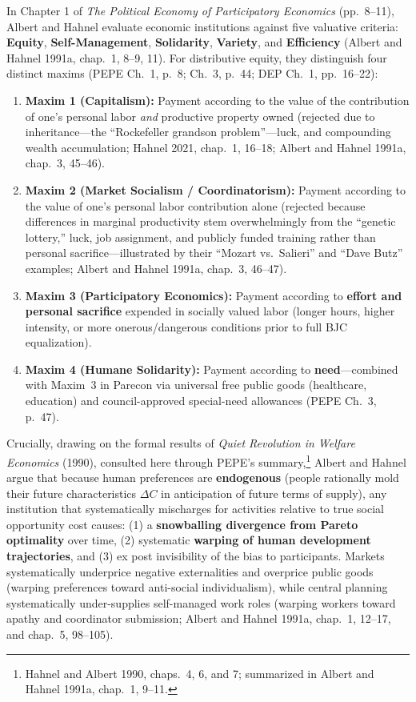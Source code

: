\documentclass[10pt,twoside,openany]{book}
\theoremstyle{dpepstyle}
\begin{document}
In Chapter 1 of \emph{The Political Economy of Participatory Economics} (pp.~8--11), Albert and Hahnel evaluate economic institutions against five valuative criteria: \textbf{Equity}, \textbf{Self-Management}, \textbf{Solidarity}, \textbf{Variety}, and \textbf{Efficiency} (Albert and Hahnel 1991a, chap.~1, 8--9, 11). For distributive equity, they distinguish four distinct maxims (PEPE Ch.~1, p.~8; Ch.~3, p.~44; DEP Ch.~1, pp.~16--22):
\begin{enumerate}[leftmargin=1.8em,itemsep=2pt]
  \item \textbf{Maxim 1 (Capitalism):} Payment according to the value of the contribution of one's personal labor \emph{and} productive property owned (rejected due to inheritance---the ``Rockefeller grandson problem''---luck, and compounding wealth accumulation; Hahnel 2021, chap.~1, 16--18; Albert and Hahnel 1991a, chap.~3, 45--46).
  \item \textbf{Maxim 2 (Market Socialism / Coordinatorism):} Payment according to the value of one's personal labor contribution alone (rejected because differences in marginal productivity stem overwhelmingly from the ``genetic lottery,'' luck, job assignment, and publicly funded training rather than personal sacrifice---illustrated by their ``Mozart vs.\ Salieri'' and ``Dave Butz'' examples; Albert and Hahnel 1991a, chap.~3, 46--47).
  \item \textbf{Maxim 3 (Participatory Economics):} Payment according to \textbf{effort and personal sacrifice} expended in socially valued labor (longer hours, higher intensity, or more onerous/dangerous conditions prior to full BJC equalization).
  \item \textbf{Maxim 4 (Humane Solidarity):} Payment according to \textbf{need}---combined with Maxim~3 in Parecon via universal free public goods (healthcare, education) and council-approved special-need allowances (PEPE Ch.~3, p.~47).
\end{enumerate}

Crucially, drawing on the formal results of \emph{Quiet Revolution in Welfare Economics} (1990), consulted here through PEPE's summary,\footnote{Hahnel and Albert 1990, chaps.~4, 6, and 7; summarized in Albert and Hahnel 1991a, chap.~1, 9--11.} Albert and Hahnel argue that because human preferences are \textbf{endogenous} (people rationally mold their future characteristics $\Delta C$ in anticipation of future terms of supply), any institution that systematically mischarges for activities relative to true social opportunity cost causes: (1) a \textbf{snowballing divergence from Pareto optimality} over time, (2) systematic \textbf{warping of human development trajectories}, and (3) ex post invisibility of the bias to participants. Markets systematically underprice negative externalities and overprice public goods (warping preferences toward anti-social individualism), while central planning systematically under-supplies self-managed work roles (warping workers toward apathy and coordinator submission; Albert and Hahnel 1991a, chap.~1, 12--17, and chap.~5, 98--105).
\end{document}
